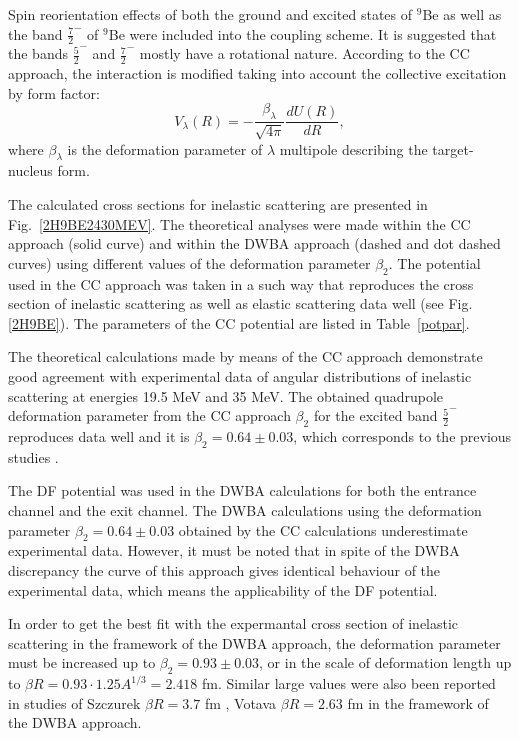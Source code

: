 \documentclass[10pt]{iopart}
\begin{document}
Spin reorientation effects of both the ground and excited states of $^9$Be  as well as  the band $\frac{7}{2}^-$ of $^9$Be were included into the coupling scheme.  It is suggested that the bands $\frac{5}{2}^-$ and $\frac{7}{2}^-$ mostly have a rotational nature. According to the CC approach, the interaction is modified taking into account the collective excitation by form factor:
\begin{equation}
V_\lambda(R)=-\frac{\beta_\lambda}{\sqrt{4\pi}} \frac{d U(R)}{dR},
\end{equation}
where $\beta_\lambda$ is the deformation parameter of  $\lambda$  multipole describing the target-nucleus form. 

The calculated cross sections for inelastic scattering are presented in Fig.~\ref{2H9BE2430MEV}. The theoretical analyses were made within the CC approach (solid curve) and within the DWBA approach (dashed and dot dashed curves) using  different values of the deformation parameter $\beta_2$. The potential used in the CC approach was taken in a such way that reproduces the cross section of inelastic scattering as well as elastic scattering data well (see Fig. \ref{2H9BE}). The parameters of the CC potential are listed in Table~\ref{potpar}.

The theoretical calculations made by means of the CC approach demonstrate good agreement with experimental data of angular distributions of inelastic scattering at energies 19.5 MeV and 35 MeV. The obtained quadrupole deformation parameter from the CC approach $\beta_2$ for the excited band $\frac{5}{2}^-$ reproduces data well and it is $\beta_2=0.64\pm0.03$, which corresponds to the previous studies \cite{lukyanov2014, harakeh1980}.

The DF potential was used  in the DWBA calculations for both the entrance channel and the exit channel. 
The DWBA calculations using the deformation parameter $\beta_2=0.64\pm0.03$ obtained by the CC calculations underestimate experimental data. However, it must be noted that in spite of the DWBA discrepancy the curve of this approach gives identical behaviour of the experimental data, which means the applicability of the DF potential. 

In order to get the best fit with the expermantal cross section of inelastic scattering in the framework of the DWBA approach, the deformation parameter must be increased up to $\beta_2=0.93\pm0.03$, or in the scale of deformation length up to $\beta R=0.93\cdot 1.25 A^{1/3}=2.418$ fm. Similar large values were also been reported in studies of Szczurek \etal  $ \beta R=3.7$ fm \cite{bodek1989},  Votava \etal  $\beta R=2.63$ fm \cite{votava1973} in the framework of the DWBA approach.
\end{document}
